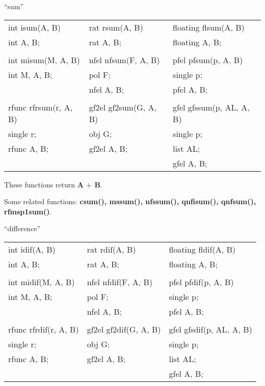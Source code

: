 \leer
\begin{center} ``sum'' \end{center}
\begin{center}
{\bf
\begin{tabular}{lll}
int isum(A, B) & rat rsum(A, B) & floating flsum(A, B)\\
int A, B;      & rat A, B;      & floating A, B;\\
&&\\
int misum(M, A, B) & nfel nfsum(F, A, B) & pfel pfsum(p, A, B)\\
int M, A, B;       & pol F;              & single p;\\
                   & nfel A, B;          & pfel A, B;\\
&&\\
rfunc rfrsum(r, A, B) & gf2el gf2sum(G, A, B) & gfel gfssum(p, AL, A, B)\\
single r;             & obj G;                & single p;\\
rfunc A, B;           & gf2el A, B;           & list AL;\\
                      &                       & gfel A, B;\\[1.5ex]
\end{tabular} }
\end{center}

These functions return {\bf A $+$ B}.

Some related functions:\hspace*{0.7em}
{\bf csum(), mssum(), nfssum(), qnfisum(), qnfsum(), \\
rfmsp1sum()}.

\begin{center} ``difference'' \end{center}
\begin{center}
{\bf
\begin{tabular}{lll}
int idif(A, B) & rat rdif(A, B) & floating fldif(A, B)\\
int A, B;      & rat A, B;      & floating A, B;\\
&&\\
int midif(M, A, B) & nfel nfdif(F, A, B) & pfel pfdif(p, A, B)\\
int M, A, B;       & pol F;              & single p;\\
                   & nfel A, B;          & pfel A, B;\\
&&\\
rfunc rfrdif(r, A, B) & gf2el gf2dif(G, A, B) & gfel gfsdif(p, AL, A, B)\\
single r;             & obj G;                & single p;\\
rfunc A, B;           & gf2el A, B;           & list AL;\\
                      &                       & gfel A, B;\\[1.5ex]
\end{tabular} }
\end{center}

